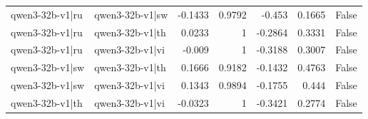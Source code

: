 \begin{table}
\begin{tabular}{l l r r r r l}
qwen3-32b-v1|ru & qwen3-32b-v1|sw & -0.1433 & 0.9792 & -0.453 & 0.1665 & False \\
qwen3-32b-v1|ru & qwen3-32b-v1|th & 0.0233 & 1 & -0.2864 & 0.3331 & False \\
qwen3-32b-v1|ru & qwen3-32b-v1|vi & -0.009 & 1 & -0.3188 & 0.3007 & False \\
qwen3-32b-v1|sw & qwen3-32b-v1|th & 0.1666 & 0.9182 & -0.1432 & 0.4763 & False \\
qwen3-32b-v1|sw & qwen3-32b-v1|vi & 0.1343 & 0.9894 & -0.1755 & 0.444 & False \\
qwen3-32b-v1|th & qwen3-32b-v1|vi & -0.0323 & 1 & -0.3421 & 0.2774 & False \\
\bottomrule
\end{tabular}
\end{table}
